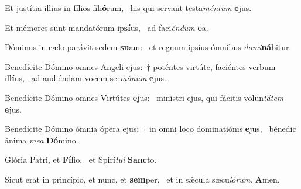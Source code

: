 \item Et justítia illíus in fílios fili\textbf{ó}rum,~\psstar{} his qui servant testa\textit{méntum} \textbf{e}jus.
\item Et mémores sunt mandatórum ip\textbf{sí}us,~\psstar{} ad faci\textit{éndum} \textbf{e}a.
\item Dóminus in cælo parávit sedem \textbf{su}am:~\psstar{} et regnum ipsíus ómnibus \textit{domi}\textbf{ná}bitur.
\item Benedícite Dómino omnes Angeli ejus:~† poténtes virtúte, faciéntes verbum il\textbf{lí}us,~\psstar{} ad audiéndam vocem ser\textit{mónum} \textbf{e}jus.
\item Benedícite Dómino omnes Virtútes \textbf{e}jus:~\psstar{} minístri ejus, qui fácitis volun\textit{tátem} \textbf{e}jus.
\item Benedícite Dómino ómnia ópera ejus:~† in omni loco dominatiónis \textbf{e}jus,~\psstar{} bénedic ánima \textit{mea} \textbf{Dó}mino.
\item Glória Patri, et \textbf{Fí}lio,~\psstar{} et Spirí\textit{tui} \textbf{Sanc}to.
\item Sicut erat in princípio, et nunc, et \textbf{sem}per,~\psstar{} et in sǽcula sæcu\textit{lórum}. \textbf{A}men.
